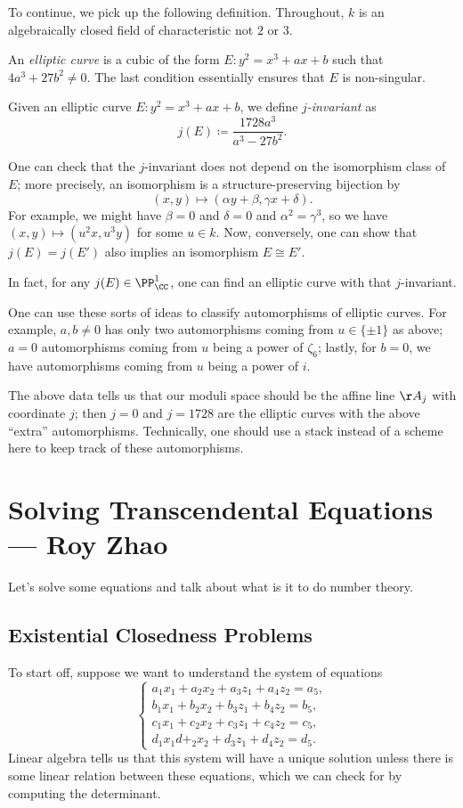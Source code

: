 \documentclass{article}
\begin{document}
To continue, we pick up the following definition. Throughout, $k$ is an algebraically closed field of characteristic not $2$ or $3$.
\begin{definition}
	An \textit{elliptic curve} is a cubic of the form $E\colon y^2=x^3+ax+b$ such that $4a^3+27b^2\ne0$. The last condition essentially ensures that $E$ is non-singular.
\end{definition}
\begin{definition}[$j$-invariant]
	Given an elliptic curve $E\colon y^2=x^3+ax+b$, we define \textit{$j$-invariant} as
	\[j(E)\coloneqq\frac{1728a^3}{a^3-27b^2}.\]
\end{definition}
One can check that the $j$-invariant does not depend on the isomorphism class of $E$; more precisely, an isomorphism is a structure-preserving bijection by
\[(x,y)\mapsto(\alpha y+\beta,\gamma x+\delta).\]
For example, we might have $\beta=0$ and $\delta=0$ and $\alpha^2=\gamma^3$, so we have $(x,y)\mapsto\left(u^2x,u^3y\right)$ for some $u\in k$. Now, conversely, one can show that $j(E)=j(E')$ also implies an isomorphism $E\cong E'$.
\begin{remark}
	In fact, for any $j(E)\in\PP^1_\CC$, one can find an elliptic curve with that $j$-invariant.
\end{remark}
\begin{remark}
	One can use these sorts of ideas to classify automorphisms of elliptic curves. For example, $a,b\ne0$ has only two automorphisms coming from $u\in\{\pm1\}$ as above; $a=0$ automorphisms coming from $u$ being a power of $\zeta_6$; lastly, for $b=0$, we have automorphisms coming from $u$ being a power of $i$.
\end{remark}
The above data tells us that our moduli space should be the affine line $\AA_j$ with coordinate $j$; then $j=0$ and $j=1728$ are the elliptic curves with the above ``extra'' automorphisms. Technically, one should use a stack instead of a scheme here to keep track of these automorphisms.

\section{Solving Transcendental Equations --- Roy Zhao}
Let's solve some equations and talk about what is it to do number theory.

\subsection{Existential Closedness Problems}
To start off, suppose we want to understand the system of equations
\[\begin{cases}
	a_1x_1+a_2x_2+a_3z_1+a_4z_2=a_5, \\
	b_1x_1+b_2x_2+b_3z_1+b_4z_2=b_5, \\
	c_1x_1+c_2x_2+c_3z_1+c_4z_2=c_5, \\
	d_1x_1d+_2x_2+d_3z_1+d_4z_2=d_5.
\end{cases}\]
Linear algebra tells us that this system will have a unique solution unless there is some linear relation between these equations, which we can check for by computing the determinant.
\end{document}
